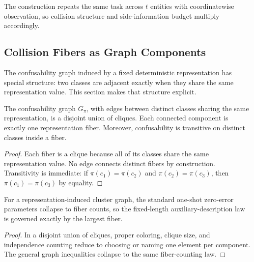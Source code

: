 \begin{remark}
The construction repeats the same task across $t$ entities with coordinatewise observation, so collision structure and side-information budget multiply accordingly.
\end{remark}

\subsection{Collision Fibers as Graph Components}

The confusability graph induced by a fixed deterministic representation has special structure: two classes are adjacent exactly when they share the same representation value. This section makes that structure explicit.

\begin{proposition}\label{prop:cluster-graph}
The confusability graph $G_\pi$, with edges between distinct classes sharing the same representation, is a disjoint union of cliques. Each connected component is exactly one representation fiber. Moreover, confusability is transitive on distinct classes inside a fiber.
\end{proposition}

\begin{proof}
Each fiber is a clique because all of its classes share the same representation value. No edge connects distinct fibers by construction. Transitivity is immediate: if $\pi(c_1)=\pi(c_2)$ and $\pi(c_2)=\pi(c_3)$, then $\pi(c_1)=\pi(c_3)$ by equality.
\end{proof}

\begin{corollary}\label{cor:capacity-collapse}
For a representation-induced cluster graph, the standard one-shot zero-error parameters collapse to fiber counts, so the fixed-length auxiliary-description law is governed exactly by the largest fiber.
\end{corollary}

\begin{proof}
In a disjoint union of cliques, proper coloring, clique size, and independence counting reduce to choosing or naming one element per component. The general graph inequalities collapse to the same fiber-counting law.
\end{proof}
